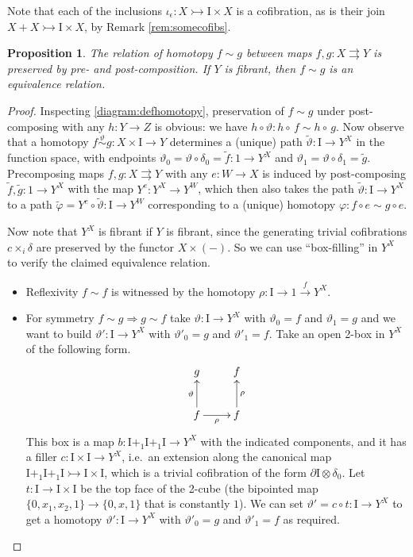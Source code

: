 \documentclass[11pt]{amsart}
\newcommand{\mono}{\ensuremath{\rightarrowtail}}
\newcommand{\ra}{\ensuremath{\rightarrow}}
\newcommand{\cof}{\ensuremath{\rightarrowtail}}
\renewcommand{\to}{\ensuremath{\rightarrow}}
\newcommand{\I}{\ensuremath{\mathrm{I}}}
\newcommand{\del}{\ensuremath{\partial}}
\newtheorem{proposition}[theorem]{Proposition}
\theoremstyle{remark}
\theoremstyle{definition}
\begin{document}
Note that each of the inclusions $\iota_\epsilon : X \cof  \I\times X$ is a cofibration, as is their join $X + X \cof  \I\times X$, by Remark \ref{rem:somecofibs}.  

\begin{proposition}\label{prop:homotopyintofibequivrel}
The relation of homotopy $f \sim g$ between maps $f, g: X\rightrightarrows Y$ is preserved by pre- and post-composition. If $Y$ is fibrant, then $f \sim g$ is an equivalence relation.
\end{proposition}
\begin{proof}
Inspecting \eqref{diagram:defhomotopy}, preservation of $f\sim g$ under post-composing with any $h : Y\to Z$ is obvious: we have $h\circ\vartheta : h\circ\,f \sim h\circ\,g$.  Now observe that a homotopy $f\stackrel{\vartheta}{\sim} g : X\times\I \ra Y$ determines a (unique) path $\tilde{\vartheta} : \I\ra Y^X$ in the function space, with endpoints $\vartheta_0 = \vartheta\circ\delta_0 = \tilde{f}: 1\ra Y^X$ and $\vartheta_1 = \vartheta\circ\delta_1 = \tilde{g}$.  
Precomposing maps $f, g: X\rightrightarrows Y$ with any $e : W \to X$ is induced by post-composing  $\tilde{f}, \tilde{g}: 1\ra Y^X$ with the map $Y^e : Y^X \to Y^W$, which then also takes the path $\tilde{\vartheta} : \I \ra Y^X$ to a path $\tilde{\varphi} = Y^e \circ \tilde{\vartheta} : \I \ra Y^W$ corresponding to a  (unique) homotopy $\varphi : f\circ e \sim g\circ e$.

Now note that $Y^X$ is fibrant if $Y$ is fibrant, since the generating trivial cofibrations $c\times_i \delta$ are preserved by the functor $X\times(-)$.  So we can use ``box-filling'' in $Y^X$ to verify the claimed equivalence relation.    \begin{itemize}
\item Reflexivity $f\sim f$ is witnessed by the homotopy $\rho:\I \ra 1 \stackrel{f}{\ra} Y^X$.  
\item For symmetry $f\sim g\Rightarrow g\sim f$ take $\vartheta : \I\ra Y^X$ with $\vartheta_0 = f$ and $\vartheta_1 = g$ and we want to build $\vartheta' : \I\ra Y^X$ with $\vartheta'_0 = g$ and $\vartheta'_1 = f$. Take an open 2-box in $Y^X$ of the following form.
\begin{equation*}%
\xymatrix{
g  & f  \\
f \ar[u]^{\vartheta} \ar[r]_\rho & f \ar[u]_\rho
}
\end{equation*}
This box is a map $b : \I+_1 \I +_1 \I \ra Y^X$ with the indicated components, and it has a filler $c : \I\times \I \ra Y^X$, i.e.\ an extension along the canonical map $\I+_1 \I +_1 \I \mono \I\times\I$, which is a trivial cofibration of the form $\del{\I} \otimes \delta_0$.  Let $t : \I\ra \I\times\I$ be the top face of the 2-cube (the bipointed map $\{0, x_1, x_2, 1\}\to \{0, x, 1\}$ that is constantly $1$).  We can set $\vartheta' = c\circ t : \I \ra Y^X$ to get a homotopy $\vartheta' : \I\ra Y^X$ with $\vartheta'_0 = g$ and $\vartheta'_1 = f$ as required.


\end{itemize}
\end{proof}
\end{document}
